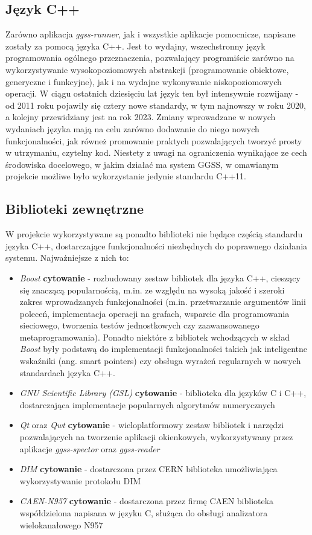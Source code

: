 \subsection{Język C++}
Zarówno aplikacja \emph{ggss-runner}, jak i wszystkie aplikacje pomocnicze, napisane zostały za pomocą języka C++. Jest to wydajny, wszechstronny język programowania ogólnego przeznaczenia, pozwalający programiście zarówno na wykorzystywanie wysokopoziomowych abstrakcji (programowanie obiektowe, generyczne i funkcyjne), jak i na wydajne wykonywanie niskopoziomowych operacji. W ciągu ostatnich dziesięciu lat język ten był intensywnie rozwijany - od 2011 roku pojawiły się cztery nowe standardy, w tym najnowszy w roku 2020, a kolejny przewidziany jest na rok 2023. Zmiany wprowadzane w nowych wydaniach języka mają na celu zarówno dodawanie do niego nowych funkcjonalności, jak równeż promowanie praktych pozwalających tworzyć prosty w utrzymaniu, czytelny kod. Niestety z uwagi na ograniczenia wynikające ze cech środowiska docelowego, w jakim działać ma system GGSS, w omawianym projekcie możliwe było wykorzystanie jedynie standardu C++11. 


\subsection{Biblioteki zewnętrzne}
W projekcie wykorzystywane są ponadto biblioteki nie będące częścią standardu języka C++, dostarczające funkcjonalności niezbędnych do poprawnego działania systemu. Najważniejsze z nich to:
\begin{itemize}
    \item \emph{Boost} \textbf{cytowanie} - rozbudowany zestaw bibliotek dla języka C++, cieszący się znaczącą popularnością, m.in. ze względu na wysoką jakość i szeroki zakres wprowadzanych funkcjonalności (m.in. przetwarzanie argumentów linii poleceń, implementacja operacji na grafach, wsparcie dla programowania sieciowego, tworzenia testów jednostkowych czy zaawansowanego metaprogramowania). Ponadto niektóre z bibliotek wchodzących w skład \emph{Boost} były podstawą do implementacji funkcjonalności takich jak inteligentne wskaźniki (ang. smart pointers) czy obsługa wyrażeń regularnych w nowych standardach języka C++.
    \item \emph{GNU Scientific Library (GSL)} \textbf{cytowanie} - biblioteka dla języków C i C++, dostarczająca implementacje popularnych algorytmów numerycznych
    \item \emph{Qt} oraz \emph{Qwt} \textbf{cytowanie} - wieloplatformowy zestaw bibliotek i narzędzi pozwalających na tworzenie aplikacji okienkowych, wykorzystywany przez aplikacje \emph{ggss-spector} oraz \emph{ggss-reader}
    \item \emph{DIM} \textbf{cytowanie} - dostarczona przez CERN biblioteka umożliwiająca wykorzystywanie protokołu DIM
    \item \emph{CAEN-N957} \textbf{cytowanie} - dostarczona przez firmę CAEN biblioteka współdzielona napisana w języku C, służąca do obsługi analizatora wielokanałowego N957
\end{itemize}



